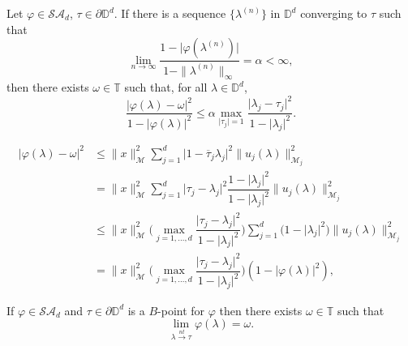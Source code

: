 \documentclass[10pt,a4paper]{amsart}
\begin{document}
\begin{theorem}\label{theorem4.9generalized}
Let $\varphi\in\mathcal{SA}_{d}$, $\tau\in\partial\mathbb{D}^{d}$. If there is a sequence $\{\lambda^{(n)}\}$ in $\mathbb{D}^{d}$ converging to $\tau$ such that
$$\lim_{n\rightarrow \infty}\dfrac{1-\lvert \varphi(\lambda^{(n)})\rvert}{1-\|\lambda^{(n)}\|_{\infty}}=\alpha<\infty,$$
then there exists $\omega\in\mathbb{T}$ such that, for all $\lambda\in\mathbb{D}^{d}$, 
\begin{equation}\label{alphamaxequtionforgeneralized}
\dfrac{\lvert \varphi(\lambda)-\omega\rvert^{2}}{1-\lvert \varphi(\lambda) \rvert^{2}} \leq \alpha \max_{\lvert \tau_{j} \rvert=1} \dfrac{\lvert \lambda_{j}-\tau_{j}\rvert^{2}}{1-\lvert \lambda_{j} \rvert^{2}}.
\end{equation}
\end{theorem}

 \begin{align}\label{phi-omega}
 \lvert \varphi(\lambda)-\omega\rvert^{2}& \leq \|x\|_{\mathcal{M}}^{2}\sum_{j=1}^{d}\lvert 1-\overline{\tau}_{j}\lambda_{j}\rvert^{2}\|u_{j}(\lambda)\|_{\mathcal{M}_{j}}^{2}\nonumber\\
&= \|x\|_{\mathcal{M}}^{2}\sum_{j=1}^{d}\lvert \tau_{j}-\lambda_{j}\rvert^{2}\dfrac{1-\lvert \lambda_{j}\rvert^{2}}{1-\lvert \lambda_{j}\rvert^{2}}\|u_{j}(\lambda)\|_{\mathcal{M}_{j}}^{2}\nonumber\\
&\leq \|x\|_{\mathcal{M}}^{2}\bigg(\max_{j=1,\hdots,d}\dfrac{\lvert \tau_{j}-\lambda_{j}\rvert^{2}}{1-\lvert \lambda_{j}\rvert^{2}}\bigg)\sum_{j=1}^{d}\Big({1-\lvert \lambda_{j}\rvert^{2}}\Big)\|u_{j}(\lambda)\|_{\mathcal{M}_{j}}^{2}\nonumber\\
&=\|x\|_{\mathcal{M}}^{2}\bigg(\max_{j=1,\hdots,d}\dfrac{\lvert \tau_{j}-\lambda_{j}\rvert^{2}}{1-\lvert \lambda_{j}\rvert^{2}}\bigg)(1-\lvert \varphi(\lambda) \rvert^{2}),
\end{align}

\begin{proposition}\label{phi-nt-omega}
    If $\varphi\in\mathcal{SA}_{d}$ and $\tau\in\partial\mathbb{D}^{d}$ is a $B$-point for $\varphi$ then there exists $\omega\in\mathbb{T}$ such that 
 $$ \lim_{\lambda{\overset{nt}\rightarrow} \tau} \varphi(\lambda)= \omega.$$  
\end{proposition}
\end{document}

